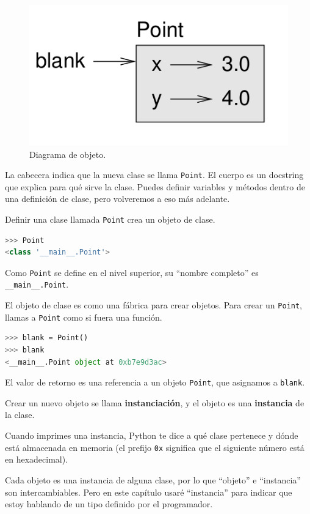 \begin{figure}[h]
\centering
\includegraphics[width=0.7\linewidth]{images/chapter_15_1.png} %
\caption{Diagrama de objeto.}
\label{fig:diagrama_estado}
\end{figure}

La cabecera indica que la nueva clase se llama \texttt{Point}. El cuerpo es un docstring que explica para qué sirve la clase. Puedes definir variables y métodos dentro de una definición de clase, pero volveremos a eso más adelante.

Definir una clase llamada \texttt{Point} crea un objeto de clase.

\begin{lstlisting}[language=Python]
>>> Point
<class '__main__.Point'>
\end{lstlisting}

Como \texttt{Point} se define en el nivel superior, su ``nombre completo'' es \texttt{\_\_main\_\_.Point}.

El objeto de clase es como una fábrica para crear objetos. Para crear un \texttt{Point}, llamas a \texttt{Point} como si fuera una función.

\begin{lstlisting}[language=Python]
>>> blank = Point()
>>> blank
<__main__.Point object at 0xb7e9d3ac>
\end{lstlisting}

El valor de retorno es una referencia a un objeto \texttt{Point}, que asignamos a \texttt{blank}.

Crear un nuevo objeto se llama \textbf{instanciación}, y el objeto es una \textbf{instancia} de la clase.

Cuando imprimes una instancia, Python te dice a qué clase pertenece y dónde está almacenada en memoria (el prefijo \texttt{0x} significa que el siguiente número está en hexadecimal).

Cada objeto es una instancia de alguna clase, por lo que ``objeto'' e ``instancia'' son intercambiables. Pero en este capítulo usaré ``instancia'' para indicar que estoy hablando de un tipo definido por el programador.

